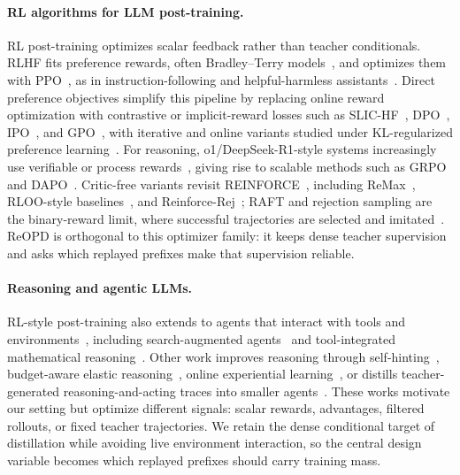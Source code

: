 \paragraph{RL algorithms for LLM post-training.}
RL post-training optimizes scalar feedback rather than teacher conditionals. RLHF
fits preference rewards, often Bradley--Terry models~\citep{bradley1952rank}, and
optimizes them with PPO~\citep{schulman2017proximal}, as in instruction-following and
helpful-harmless assistants~\citep{ouyang2022training,bai2022training}. Direct
preference objectives simplify this pipeline by replacing online reward optimization
with contrastive or implicit-reward losses such as SLIC-HF~\citep{zhao2023slic},
DPO~\citep{rafailov2023direct}, IPO~\citep{azar2023general}, and
GPO~\citep{tang2024generalized}, with iterative and online variants studied under
KL-regularized preference learning~\citep{xiong2024iterative,dong2024rlhf}. For
reasoning, o1/DeepSeek-R1-style systems increasingly use verifiable or process
rewards~\citep{jaech2024openai,deepseekai2025deepseekr1incentivizingreasoningcapability,wang2023mathshepherd,zhang2024entropyregularizedprocessrewardmodel},
giving rise to scalable methods such as GRPO~\citep{shao2024deepseekmath} and
DAPO~\citep{yu2025dapo}. Critic-free variants revisit
REINFORCE~\citep{williams1992simple}, including ReMax~\citep{li2023remax},
RLOO-style baselines~\citep{ahmadian2024back,kool2019buy}, and
Reinforce-Rej~\citep{xiong2025minimalist}; RAFT and rejection sampling are the
binary-reward limit, where successful trajectories are selected and
imitated~\citep{dong2023raft,liu2023statistical,xiong2025minimalist}. ReOPD is
orthogonal to this optimizer family: it keeps dense teacher supervision and asks
which replayed prefixes make that supervision reliable.

\paragraph{Reasoning and agentic LLMs.}
RL-style post-training also extends to agents that interact with tools and
environments~\citep{yao2022react,schick2023toolformer,nakano2021webgpt}, including
search-augmented agents~\citep{jin2025search} and tool-integrated mathematical
reasoning~\citep{gou2023tora,mint2024a}. Other work improves reasoning through
self-hinting~\citep{liao2026selfhinting}, budget-aware elastic
reasoning~\citep{xu2025elasticreasoning}, online experiential
learning~\citep{ye2026onlineexperiential}, or distills teacher-generated
reasoning-and-acting traces into smaller agents~\citep{chen2023fireact,chen2024agentflan}.
These works motivate our setting but optimize different signals: scalar rewards,
advantages, filtered rollouts, or fixed teacher trajectories. We retain the dense
conditional target of distillation while avoiding live environment interaction, so the central design variable becomes which replayed prefixes should carry training
mass.

